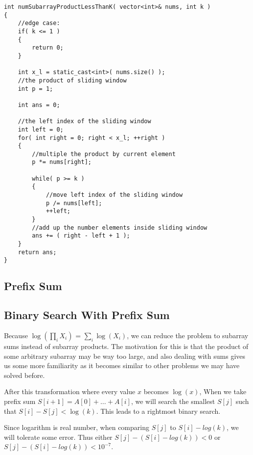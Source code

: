 \setcounter{lstlisting}{0}
\begin{lstlisting}[style=customc, caption={Sliding Window}]
int numSubarrayProductLessThanK( vector<int>& nums, int k )
{
    //edge case:
    if( k <= 1 )
    {
        return 0;
    }

    int x_l = static_cast<int>( nums.size() );
    //the product of sliding window
    int p = 1;

    int ans = 0;

    //the left index of the sliding window
    int left = 0;
    for( int right = 0; right < x_l; ++right )
    {
        //multiple the product by current element
        p *= nums[right];

        while( p >= k )
        {
            //move left index of the sliding window
            p /= nums[left];
            ++left;
        }
        //add up the number elements inside sliding window
        ans += ( right - left + 1 );
    }
    return ans;
}
\end{lstlisting}

\subsection{Prefix Sum}
\subsection{Binary Search With Prefix Sum}
Because $\log\left(\prod\limits_i X_i\right)$ = $\sum\limits_i \log\left(X_i\right)$, we can reduce the problem to subarray sums instead of subarray products. The motivation for this is that the product of some arbitrary subarray may be way too large, and also dealing with sums gives us some more familiarity as it becomes similar to other problems we may have solved before.

After this transformation where every value $x$ becomes $\log(x)$, When we take prefix sum $S[i+1] = A[0]+\ldots+A[i]$, we will search the smallest $S[j]$ such that $S[i] - S[j] < \log(k)$. This leads to a rightmost binary search.

Since logarithm is real number, when comparing $S[j]$ to $S[i] - log(k)$, we will tolerate some error. Thus either $S[j] - (S[i]-log(k)) < 0$ or  $S[j] - (S[i]-log(k)) < 10^{-7}$.

